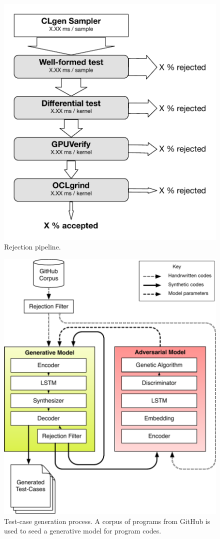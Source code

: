\begin{figure}
        \centering
        \includegraphics[width=.8\columnwidth]{img/rej} %
        \caption{%
                Rejection pipeline.%
        }%
        \label{fig:deeptune}
\end{figure}

\begin{figure}
        \centering
        \includegraphics[width=.95\columnwidth]{img/clgen} %
        \caption{%
                Test-case generation process. A corpus of programs from GitHub is used to seed a generative model for program codes.%
        }%
        \label{fig:deeptune}
\end{figure}

